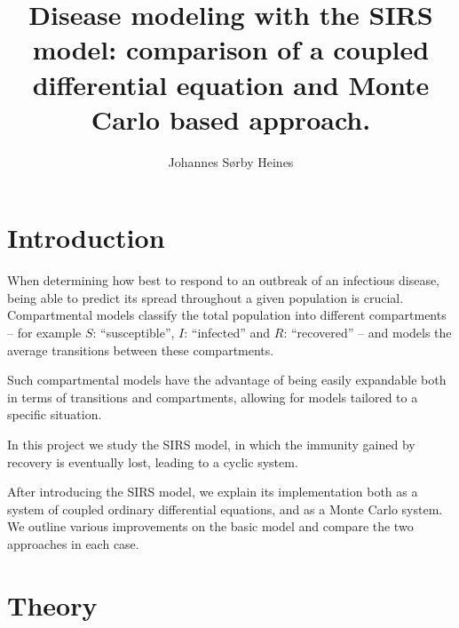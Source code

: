 \documentclass[a4paper,10pt,twocolumn]{article}
\title{Disease modeling with the SIRS model: comparison of a coupled differential equation and Monte Carlo based approach.}
\author{Johannes Sørby Heines}
\begin{document}

\section{Introduction}

When determining how best  to respond to an outbreak of an infectious disease, being able to predict its spread throughout a given population is crucial.
Compartmental models classify the total population into different compartments – for example $S$: ``susceptible'', $I$: ``infected'' and $R$: ``recovered'' – and models the average transitions between these compartments. 

Such compartmental models have the advantage of being easily expandable both in terms of transitions and compartments, allowing for models tailored to a specific situation.   


In this project we study the SIRS model, in which the immunity gained by recovery is eventually lost, leading to a cyclic system. 

 
After introducing the SIRS model, we explain its implementation both as a system of coupled ordinary differential equations, and as a Monte Carlo system. 
We outline various improvements on the basic model and compare the two approaches in each case.   

%
%
%
\section{Theory}
\end{document}
